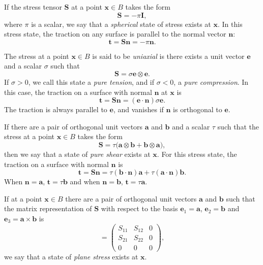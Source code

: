 \documentclass[
  letterpaper,
  DIV=11,
  numbers=noendperiod]{scrreprt}
\theoremstyle{plain}
\theoremstyle{remark}
\begin{document}
If the stress tensor \({\boldsymbol{S}}\) at a point
\({\boldsymbol{x}}\in B\) takes the form
\[{\boldsymbol{S}}= -\pi{\boldsymbol{I}},\] where \(\pi\) is a scalar,
we say that a \emph{spherical} state of stress exists at
\({\boldsymbol{x}}\). In this stress state, the traction on any surface
is parallel to the normal vector \({\boldsymbol{n}}\):
\[{\boldsymbol{t}}= {\boldsymbol{S}}{\boldsymbol{n}}= -\pi{\boldsymbol{n}}.\]

The stress at a point \({\boldsymbol{x}}\in B\) is said to be
\emph{uniaxial} is there exists a unit vector \({\boldsymbol{e}}\) and a
scalar \(\sigma\) such that
\[{\boldsymbol{S}}= \sigma {\boldsymbol{e}}\otimes{\boldsymbol{e}}.\] If
\(\sigma>0\), we call this state a \emph{pure tension}, and if
\(\sigma<0\), a \emph{pure compression}. In this case, the traction on a
surface with normal \({\boldsymbol{n}}\) at \({\boldsymbol{x}}\) is
\[{\boldsymbol{t}}= {\boldsymbol{S}}{\boldsymbol{n}}= ({\boldsymbol{e}}\cdot{\boldsymbol{n}})\sigma {\boldsymbol{e}}.\]
The traction is always parallel to \({\boldsymbol{e}}\), and vanishes if
\({\boldsymbol{n}}\) is orthogonal to \({\boldsymbol{e}}\).

If there are a pair of orthogonal unit vectors \({\boldsymbol{a}}\) and
\({\boldsymbol{b}}\) and a scalar \(\tau\) such that the stress at a
point \({\boldsymbol{x}}\in B\) takes the form
\[{\boldsymbol{S}}=\tau\big({\boldsymbol{a}}\otimes{\boldsymbol{b}}+{\boldsymbol{b}}\otimes{\boldsymbol{a}}),\]
then we say that a state of \emph{pure shear} exists at
\({\boldsymbol{x}}\). For this stress state, the traction on a surface
with normal \({\boldsymbol{n}}\) is
\[{\boldsymbol{t}}= {\boldsymbol{S}}{\boldsymbol{n}}= \tau ({\boldsymbol{b}}\cdot{\boldsymbol{n}}){\boldsymbol{a}}+\tau ({\boldsymbol{a}}\cdot{\boldsymbol{n}}){\boldsymbol{b}}.\]
When \({\boldsymbol{n}}={\boldsymbol{a}}\),
\({\boldsymbol{t}}=\tau{\boldsymbol{b}}\) and when
\({\boldsymbol{n}}={\boldsymbol{b}}\),
\({\boldsymbol{t}}=\tau{\boldsymbol{a}}\).

If at a point \({\boldsymbol{x}}\in B\) there are a pair of orthogonal
unit vectors \({\boldsymbol{a}}\) and \({\boldsymbol{b}}\) such that the
matrix representation of \({\boldsymbol{S}}\) with respect to the basis
\({\boldsymbol{e}}_1={\boldsymbol{a}}\),
\({\boldsymbol{e}}_2={\boldsymbol{b}}\) and
\({\boldsymbol{e}}_3={\boldsymbol{a}}\times{\boldsymbol{b}}\) is
\[= \left(
    \begin{array}{ccc}
      S_{11} & S_{12} & 0 \\
      S_{21} & S_{22} & 0 \\
      0     & 0     & 0
    \end{array}\right),\] we say that a state of \emph{plane stress}
exists at \({\boldsymbol{x}}\).
\end{document}
